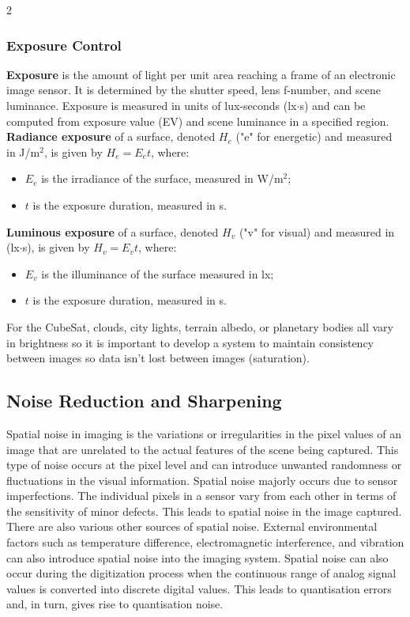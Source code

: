 \documentclass[10pt]{article}
\begin{document}
\begin{multicols}{2}
\subsubsection{Exposure Control}
\textbf{Exposure} is the amount of light per unit area reaching a frame of an electronic image sensor. It is determined by the shutter speed, lens f-number, and scene luminance. Exposure is measured in units of lux-seconds (lx$\cdot$s) and can be computed from exposure value (EV) and scene luminance in a specified region.
\newline \newline
\textbf{Radiance exposure} of a surface, denoted $H_e$ ("e" for energetic) and measured in J/m$^2$, is given by $H_e=E_et$, where:
\begin{itemize}
    \item $E_e$ is the irradiance of the surface, measured in W/m$^2$;
    \item $t$ is the exposure duration, measured in s.
\end{itemize}
\textbf{Luminous exposure} of a surface, denoted $H_v$ ("v" for visual) and measured in (lx$\cdot$s), is given by $H_v=E_vt$, where:
\begin{itemize}
    \item $E_v$ is the illuminance of the surface measured in lx;
    \item $t$ is the exposure duration, measured in s.
\end{itemize}
For the CubeSat, clouds, city lights, terrain albedo, or planetary bodies all vary in brightness so it is important to develop a system to maintain consistency between images so data isn't lost between images (saturation).

\subsection{Noise Reduction and Sharpening}
Spatial noise in imaging is the variations or irregularities in the pixel values of an image that are unrelated to the actual features of the scene being captured. This type of noise occurs at the pixel level and can introduce unwanted randomness or fluctuations in the visual information.
\newline \newline
Spatial noise majorly occurs due to sensor imperfections. The individual pixels in a sensor vary from each other in terms of the sensitivity of minor defects. This leads to spatial noise in the image captured.
\newline \newline
There are also various other sources of spatial noise. External environmental factors such as temperature difference, electromagnetic interference, and vibration can also introduce spatial noise into the imaging system. Spatial noise can also occur during the digitization process when the continuous range of analog signal values is converted into discrete digital values. This leads to quantisation errors and, in turn, gives rise to quantisation noise.

\end{multicols}
\end{document}
